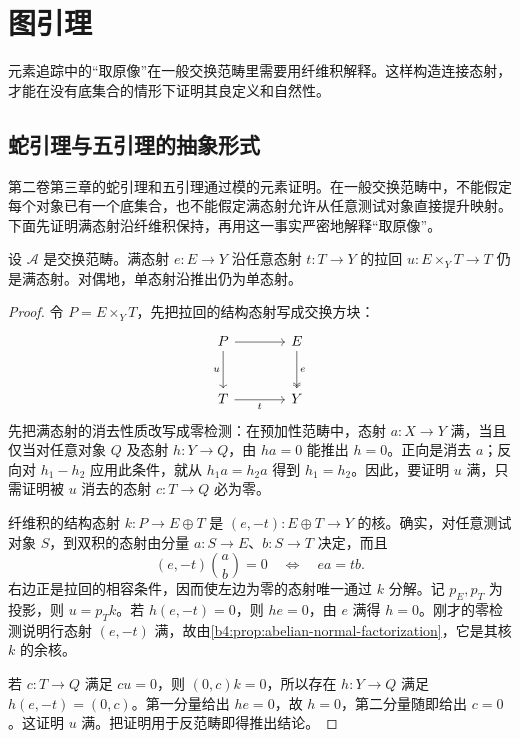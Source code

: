 
\section{图引理}
\label{b4:sec:0404}

元素追踪中的“取原像”在一般交换范畴里需要用纤维积解释。这样构造连接态射，才能在没有底集合的情形下证明其良定义和自然性。

%
%
%

\subsection{蛇引理与五引理的抽象形式}
\label{b4:subsec:0404:01}

第二卷第三章的蛇引理和五引理通过模的元素证明。在一般交换范畴中，不能假定每个对象已有一个底集合，也不能假定满态射允许从任意测试对象直接提升映射。下面先证明满态射沿纤维积保持，再用这一事实严密地解释“取原像”。

\begin{lemma}\label{b4:lem:epi-pullback}
	设 \(\mathcal A\) 是交换范畴。满态射 \(e:E\to Y\) 沿任意态射 \(t:T\to Y\) 的拉回 \(u:E\times_YT\to T\) 仍是满态射。对偶地，单态射沿推出仍为单态射。
\end{lemma}
\begin{proof}
	令 \(P=E\times_YT\)，先把拉回的结构态射写成交换方块：
	\[
		\begin{tikzcd}[column sep=large,row sep=large]
			P\arrow[r]\arrow[d,"u"']&E\arrow[d,two heads,"e"]\\
			T\arrow[r,"t"']&Y
		\end{tikzcd}
	\]
	先把满态射的消去性质改写成零检测：在预加性范畴中，态射 \(a:X\to Y\) 满，当且仅当对任意对象 \(Q\) 及态射 \(h:Y\to Q\)，由 \(ha=0\) 能推出 \(h=0\)。正向是消去 \(a\)；反向对 \(h_1-h_2\) 应用此条件，就从 \(h_1a=h_2a\) 得到 \(h_1=h_2\)。因此，要证明 \(u\) 满，只需证明被 \(u\) 消去的态射 \(c:T\to Q\) 必为零。

	纤维积的结构态射 \(k:P\to E\oplus T\) 是 \((e,-t):E\oplus T\to Y\) 的核。确实，对任意测试对象 \(S\)，到双积的态射由分量 \(a:S\to E\)、\(b:S\to T\) 决定，而且
	\[
		(e,-t)\binom{a}{b}=0 \quad\Longleftrightarrow\quad ea=tb.
	\]
	右边正是拉回的相容条件，因而使左边为零的态射唯一通过 \(k\) 分解。记 \(p_E,p_T\) 为投影，则 \(u=p_Tk\)。若 \(h(e,-t)=0\)，则 \(he=0\)，由 \(e\) 满得 \(h=0\)。刚才的零检测说明行态射 \((e,-t)\) 满，故由\cref{b4:prop:abelian-normal-factorization}，它是其核 \(k\) 的余核。

	若 \(c:T\to Q\) 满足 \(cu=0\)，则 \((0,c)k=0\)，所以存在 \(h:Y\to Q\) 满足 \(h(e,-t)=(0,c)\)。第一分量给出 \(he=0\)，故 \(h=0\)，第二分量随即给出 \(c=0\)。这证明 \(u\) 满。把证明用于反范畴即得推出结论。
\end{proof}

